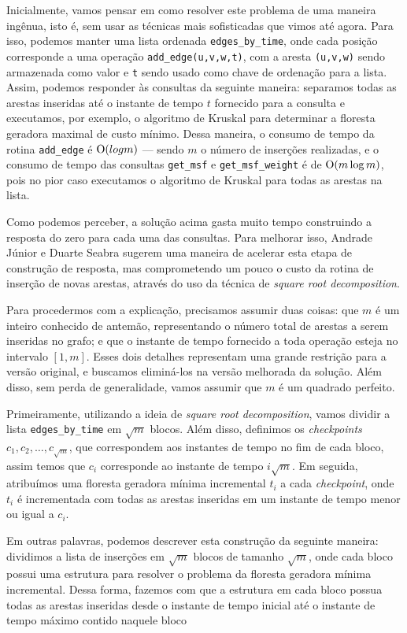 Inicialmente, vamos pensar em como resolver este problema de uma maneira ingênua, isto é, sem usar as técnicas mais sofisticadas que vimos até agora. Para isso, podemos manter uma lista ordenada \texttt{edges\_by\_time}, onde cada posição corresponde a uma operação \texttt{add\_edge(u,v,w,t)}, com a aresta \texttt{(u,v,w)} sendo armazenada como valor e \texttt{t} sendo usado como chave de ordenação para a lista. Assim, podemos responder às consultas da seguinte maneira: separamos todas as arestas inseridas até o instante de tempo $t$ fornecido para a consulta e executamos, por exemplo, o algoritmo de Kruskal para determinar a floresta geradora maximal de custo mínimo. Dessa maneira, o consumo de tempo da rotina \texttt{add\_edge} é $\mathrm{O} (log m)$ --- sendo $m$ o número de inserções realizadas, e o consumo de tempo das consultas \texttt{get\_msf} e \texttt{get\_msf\_weight} é de $\mathrm{O}(m \log m)$, pois no pior caso executamos o algoritmo de Kruskal para todas as arestas na lista.

Como podemos perceber, a solução acima gasta muito tempo construindo a resposta do zero para cada uma das consultas. Para melhorar isso, Andrade Júnior e Duarte Seabra sugerem uma maneira de acelerar esta etapa de construção de resposta, mas comprometendo um pouco o custo da rotina de inserção de novas arestas, através do uso da técnica de \emph{square root decomposition}.

Para procedermos com a explicação, precisamos assumir duas coisas: que $m$ é um inteiro conhecido de antemão, representando o número total de arestas a serem inseridas no grafo; e que o instante de tempo fornecido a toda operação esteja no intervalo $[1,m]$. Esses dois detalhes representam uma grande restrição para a versão original, e buscamos eliminá-los na versão melhorada da solução. Além disso, sem perda de generalidade, vamos assumir que $m$ é um quadrado perfeito.

Primeiramente, utilizando a ideia de \emph{square root decomposition}, vamos dividir a lista \texttt{edges\_by\_time} em $\sqrt{m}$ blocos. Além disso, definimos os \emph{checkpoints} $c_1, c_2, \dots, c_{\sqrt{m}}$, que correspondem aos instantes de tempo no fim de cada bloco, assim temos que $c_i$ corresponde ao instante de tempo $i \sqrt{m}$. Em seguida, atribuímos uma floresta geradora mínima incremental $t_i$ a cada \emph{checkpoint}, onde $t_i$ é incrementada com todas as arestas inseridas em um instante de tempo menor ou igual a $c_i$.

Em outras palavras, podemos descrever esta construção da seguinte maneira: dividimos a lista de inserções em $\sqrt{m}$ blocos de tamanho $\sqrt{m}$, onde cada bloco possui uma estrutura para resolver o problema da floresta geradora mínima incremental. Dessa forma, fazemos com que a estrutura em cada bloco possua todas as arestas inseridas desde o instante de tempo inicial até o instante de tempo máximo contido naquele bloco


